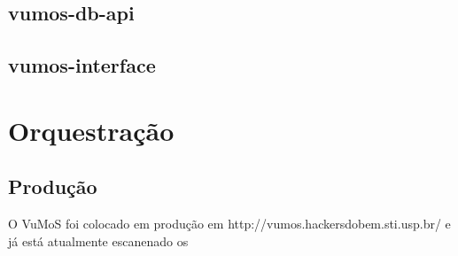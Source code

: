     \subsection{vumos-db-api}
    \subsection{vumos-interface}
    

\section{Orquestração}
    
    \subsection{Produção}
    O VuMoS foi colocado em produção em http://vumos.hackersdobem.sti.usp.br/ e já está atualmente escanenado os  

